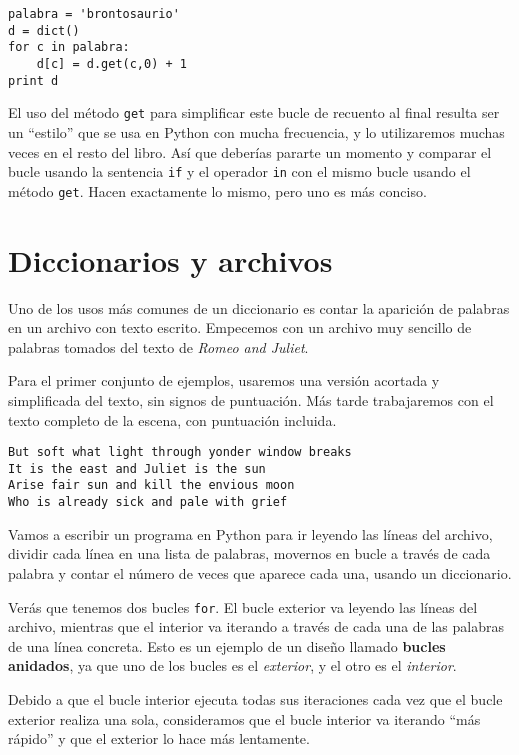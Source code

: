 \beforeverb
\begin{verbatim}
palabra = 'brontosaurio'
d = dict()
for c in palabra:
    d[c] = d.get(c,0) + 1
print d
\end{verbatim}
\afterverb
%
El uso del método {\tt get} para simplificar este bucle de recuento
al final resulta ser un ``estilo'' que se usa en Python con mucha frecuencia, y
lo utilizaremos muchas veces en el resto del libro. Así que deberías
pararte un momento y comparar el bucle usando la sentencia {\tt if}
y el operador {\tt in} con el mismo bucle usando el método {\tt get}.
Hacen exactamente lo mismo, pero uno es más conciso.

\section{Diccionarios y archivos}

Uno de los usos más comunes de un diccionario es contar la aparición
de palabras en un archivo con texto escrito.
Empecemos con un archivo muy sencillo de
palabras tomados del texto de \emph{Romeo and Juliet}.

Para el primer conjunto de ejemplos, usaremos una versión acortada y simplificada
del texto, sin signos de puntuación. Más tarde trabajaremos con el texto completo
de la escena, con puntuación incluida.

\beforeverb
\begin{verbatim}
But soft what light through yonder window breaks
It is the east and Juliet is the sun
Arise fair sun and kill the envious moon
Who is already sick and pale with grief
\end{verbatim}
\afterverb
%
Vamos a escribir un programa en Python para ir leyendo las líneas del archivo,
dividir cada línea en una lista de palabras, movernos en bucle a través de cada
palabra y contar el número de veces que aparece cada una, usando un diccionario.

Verás que tenemos dos bucles {\tt for}. El bucle exterior va leyendo las
líneas del archivo, mientras que el interior va iterando a través de cada
una de las palabras de una línea concreta. Esto es un ejemplo
de un diseño llamado {\bf bucles anidados}, ya que uno de los bucles
es el \emph{exterior}, y el otro es el \emph{interior}.

Debido a que el bucle interior ejecuta todas sus iteraciones cada vez
que el bucle exterior realiza una sola, consideramos
que el bucle interior va iterando ``más rápido'' y que el exterior lo hace
más lentamente.

